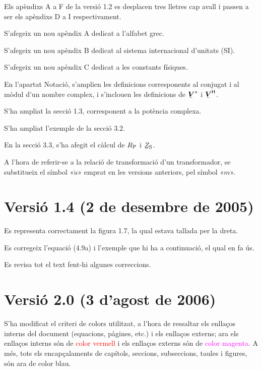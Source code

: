 Els apèndixs A a F de la versió 1.2 es desplacen tres lletres cap
avall i passen a ser els apèndixs D a I respectivament.

S'afegeix un nou apèndix A dedicat a l'alfabet grec.

S'afegeix un nou apèndix B dedicat al sistema internacional
d'unitats (SI).

S'afegeix un nou apèndix C dedicat a les constants físiques.

En l'apartat Notació, s'amplien les definicions corresponents al
conjugat i al mòdul d'un nombre complex, i s'inclouen les
definicions de $\mcmplx{V}^*$ i $\hermit{V}$.

S'ha ampliat la secció 1.3, corresponent a la
potència complexa.

 S'ha ampliat l'exemple de la secció 3.2.

En la secció 3.3, s'ha afegit el càlcul de $R_\mathrm{P}$ i
$\cmplx{Z}\ped{S}$.

 A l'hora de referir-se a la
relació de transformació d'un transformador, se substitueix el
símbol «$\ddot{u}$» emprat en les versions anteriors, pel símbol
«$m$».

\section*{Versió 1.4 (2 de desembre de 2005)}

Es representa correctament la figura 1.7, la qual estava
tallada per la dreta.

Es corregeix l'equació (4.9a) i l'exemple que hi
ha a continuació, el qual en fa ús.

Es revisa tot el text fent-hi algunes correccions.

\section*{Versió 2.0 (3 d'agost de 2006)}

S'ha modificat el criteri de colors utilitzat, a l'hora de ressaltar
els enllaços interns del document (equacions, pàgines, etc.) i els
enllaços externs; ara els enllaços interns són de
\textcolor{red}{color vermell} i els enllaços externs són de
\textcolor{magenta}{color magenta}. A més, tots els encapçalaments
de capítols, seccions,
 subseccions, taules  i figures, són ara de
 \textcolor{NavyBlue}{color blau}.


